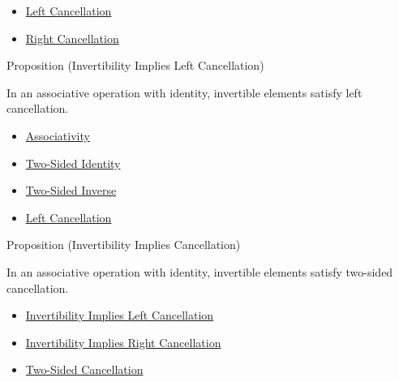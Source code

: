 \begin{dependencies}
\begin{itemize}
  \item \hyperref[def:left-cancellation]{Left Cancellation}
  \item \hyperref[def:right-cancellation]{Right Cancellation}
\end{itemize}
\end{dependencies}

\begin{propositionbox}{Proposition (Invertibility Implies Left Cancellation)}
\begin{proposition}
\label{prop:invertibility-implies-left-cancellation}
In an associative operation with identity, invertible elements satisfy left
cancellation.
\end{proposition}
\end{propositionbox}

\begin{dependencies}
\begin{itemize}
  \item \hyperref[def:associativity]{Associativity}
  \item \hyperref[def:two-sided-identity]{Two-Sided Identity}
  \item \hyperref[def:two-sided-inverse]{Two-Sided Inverse}
  \item \hyperref[def:left-cancellation]{Left Cancellation}
\end{itemize}
\end{dependencies}

\begin{propositionbox}{Proposition (Invertibility Implies Cancellation)}
\begin{proposition}
\label{prop:invertibility-implies-cancellation}
In an associative operation with identity, invertible elements satisfy
two-sided cancellation.
\end{proposition}
\end{propositionbox}

\begin{dependencies}
\begin{itemize}
  \item \hyperref[prop:invertibility-implies-left-cancellation]{Invertibility Implies Left Cancellation}
  \item \hyperref[prop:invertibility-implies-right-cancellation]{Invertibility Implies Right Cancellation}
  \item \hyperref[def:two-sided-cancellation]{Two-Sided Cancellation}
\end{itemize}
\end{dependencies}

